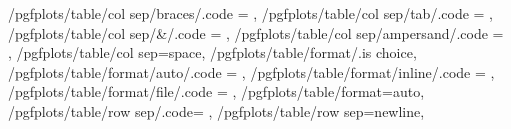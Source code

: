{	/pgfplots/table/col sep/braces/.code	= {\def\pgfplotstableread@COLSEP@CASE{4}},
	/pgfplots/table/col sep/tab/.code		= {\def\pgfplotstableread@COLSEP@CASE{5}},
	/pgfplots/table/col sep/&/.code			= {\def\pgfplotstableread@COLSEP@CASE{6}\pgfplotstable@trimcellstrue},
	/pgfplots/table/col sep/ampersand/.code	= {\def\pgfplotstableread@COLSEP@CASE{6}\pgfplotstable@trimcellstrue},
	/pgfplots/table/col sep=space,
	/pgfplots/table/format/.is choice,
	/pgfplots/table/format/auto/.code		= {\def\pgfplotstableread@FORMAT@CASE{0}},
	/pgfplots/table/format/inline/.code		= {\def\pgfplotstableread@FORMAT@CASE{1}},
	/pgfplots/table/format/file/.code		= {\def\pgfplotstableread@FORMAT@CASE{2}},
	/pgfplots/table/format=auto,
	/pgfplots/table/row sep/.code={%
	},%
	/pgfplots/table/row sep=newline,
}


